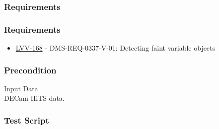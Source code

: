 \hypertarget{requirements-66}{%
\subsubsection{Requirements}\label{requirements-66}}

\hypertarget{requirements-67}{%
\subsubsection{Requirements}\label{requirements-67}}

\begin{itemize}
\tightlist
\item
  \href{https://jira.lsstcorp.org/browse/LVV-168}{LVV-168} -
  DMS-REQ-0337-V-01: Detecting faint variable objects
\end{itemize}

\hypertarget{precondition-6}{%
\subsubsection{Precondition}\label{precondition-6}}

Input Data\\
DECam HiTS data.

\hypertarget{test-script-33}{%
\subsubsection{Test Script}\label{test-script-33}}

